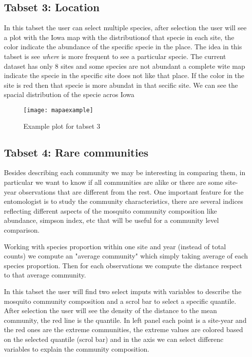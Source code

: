 \documentclass{article}\usepackage[]{graphicx}\usepackage[]{color}
\begin{document}
\subsection{Tabset 3: Location} 
In this tabset the user can select multiple species, after selection the user will see a plot with the Iowa map with the distributionof that specie in each site, the color indicate the abundance of the specific specie in the place. The idea in this tabset is see \textit{where} is more frequent to see a particular specie. The current dataset has only 8 sites and some species are not abundant a complete wite  map indicate the specie in the specific site does not like that place. If the color in the site is red then that specie is more abundat in that secific site. We can see the spacial distribution of the specie acros Iowa




\begin{figure}
\texttt{[image: mapaexample]}
\caption{Example plot for tabset 3 \label{tab3}}
\end{figure}

\subsection{Tabset 4: Rare communities}
Besides describing each community we may be interesting in comparing them, in particular we want to know if all communities are alike or there are some site-year observations that are different from the rest. 
One important feature for the entomologist is to study the community characteristics, there are several indices reflecting different aspects of the mosquito community composition like abundance, simpson index, etc that will be useful for a community level comparison.

Working with species proportion within one site and year (instead of total counts) we compute an "average community" which simply taking average of each species proportion. 
Then for each observations we compute the distance respect to that average community. 

In this tabset the user will find  two select imputs with variables to describe the mosquito community composition and a scrol bar to select a specific quantile. After selection the user will see the density of the distance to the mean community, the red line is the quantile. In left panel each point is a site-year and the red ones are the extreme communities, the extreme values are colored based on the selected quantile (scrol bar) and in the axis we can select differenc variables to explain the community composition.  
\end{document}
